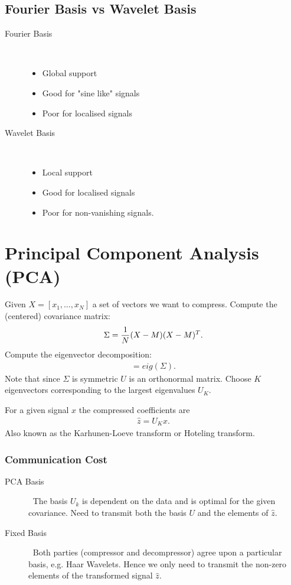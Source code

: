 \subsection{Fourier Basis vs Wavelet Basis}
\begin{description}
\item[Fourier Basis] $\ $
    \begin{itemize}
    \item Global support
    \item Good for "sine like" signals
    \item Poor for localised signals
    \end{itemize}
\item[Wavelet Basis] $\ $
    \begin{itemize}
    \item Local support
    \item Good for localised signals
    \item Poor for non-vanishing signals.
    \end{itemize}
\end{description}


\section{Principal Component Analysis (PCA)}
Given $X=[x_1,\ldots, x_N]$ a set of vectors we want to compress. Compute the (centered) covariance matrix:
\begin{align*}
    \Sigma = {1\over N} (X-M)(X-M)^T.
\end{align*}
Compute the eigenvector decomposition:
\begin{align*}
    [U\Lambda] = eig(\Sigma).
\end{align*}
Note that since $\Sigma$ is symmetric $U$ is an orthonormal matrix. Choose $K$ eigenvectors corresponding to the largest eigenvalues $U_K$.

For a given signal $x$ the compressed coefficients are
\begin{align*}
    \hat z = U_K x.
\end{align*}
Also known as the Karhunen-Loeve transform or Hoteling transform.

\subsubsection{Communication Cost}
\begin{description}
\item[PCA Basis] $\ $
    \subitem The basis $U_k$ is dependent on the data and is optimal for the given covariance.
    \subitem Need to transmit both the basis $U$ and the elements of $\hat z$.
\item[Fixed Basis] $\ $
    \subitem Both parties (compressor and decompressor) agree upon a particular basis, e.g. Haar Wavelets.
    \subitem Hence we only need to transmit the non-zero elements of the transformed signal $\hat z$.
\end{description}

